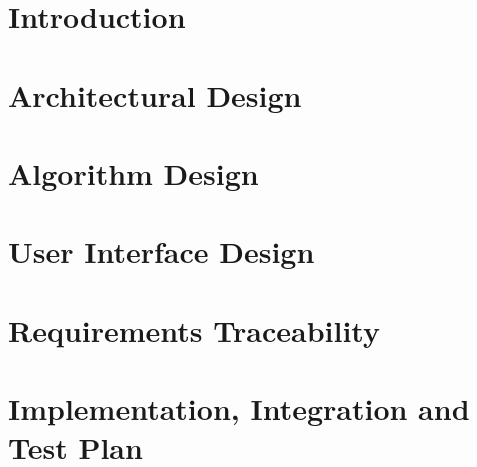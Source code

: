 \clearpage
\tableofcontents
\listoffigures
\listoftables



\clearpage
{\section{Introduction}}
\label{sect:introduction}


\clearpage
{\section{Architectural Design}}
\label{sect:architecturaldesign}


\clearpage
{\section{Algorithm Design}}
\label{sect:algorithm}


\clearpage
{\section{User Interface Design}}
\label{sect:uidesign}


\clearpage
{\section{Requirements Traceability}}
\label{sect:requirements}


\clearpage
{\section{Implementation, Integration and Test Plan}}
\label{sect:implinttest}


